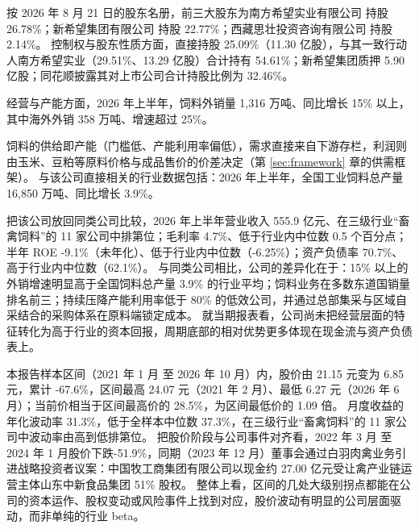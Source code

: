  按 2026 年 8 月 21 日的股东名册，前三大股东为南方希望实业有限公司 持股 26.78\%；新希望集团有限公司 持股 22.77\%；西藏思壮投资咨询有限公司 持股 2.14\%。 控制权与股东性质方面，直接持股 25.09\%（11.30 亿股），与其一致行动人南方希望实业（29.51\%、13.29 亿股）合计持有 54.61\%；新希望集团质押 5.90 亿股；同花顺披露其对上市公司合计持股比例为 32.46\%。

 经营与产能方面，2026 年上半年，饲料外销量 1,316 万吨、同比增长 15\% 以上，其中海外外销 358 万吨、增速超过 25\%。

 饲料的供给即产能（门槛低、产能利用率偏低），需求直接来自下游存栏，利润则由玉米、豆粕等原料价格与成品售价的价差决定（第 \ref{sec:framework} 章的供需框架）。 与该公司直接相关的行业数据包括：2026 年上半年，全国工业饲料总产量 16,850 万吨、同比增长 3.9\%。

 把该公司放回同类公司比较，2026 年上半年营业收入 555.9 亿元、在三级行业“畜禽饲料”的 11 家公司中排第位；毛利率 4.7\%、低于行业内中位数 0.5 个百分点；半年 ROE -9.1\%（未年化）、低于行业内中位数（-6.25\%）；资产负债率 70.7\%、高于行业内中位数（62.1\%）。 与同类公司相比，公司的差异化在于：15\% 以上的外销增速明显高于全国饲料总产量 3.9\% 的行业平均；饲料业务在多数东道国销量排名前三；持续压降产能利用率低于 80\% 的低效公司，并通过总部集采与区域自采结合的采购体系在原料端锁定成本。 就当期报表看，公司尚未把经营层面的特征转化为高于行业的资本回报，周期底部的相对优势更多体现在现金流与资产负债表上。

 本报告样本区间（2021 年 1 月 至 2026 年 10 月）内，股价由 21.15 元变为 6.85 元，累计 -67.6\%，区间最高 24.07 元（2021 年 2 月）、最低 6.27 元（2026 年 6 月）；当前价相当于区间最高价的 28.5\%，为区间最低价的 1.09 倍。 月度收益的年化波动率 31.3\%，低于全样本中位数 37.3\%，在三级行业“畜禽饲料”的 11 家公司中波动率由高到低排第位。 把股价阶段与公司事件对齐看，2022 年 3 月 至 2024 年 1 月股价下跌-51.9\%，同期（2023 年 12 月）董事会通过白羽肉禽业务引进战略投资者议案：中国牧工商集团有限公司以现金约 27.00 亿元受让禽产业链运营主体山东中新食品集团 51\% 股权。 整体上看，区间的几处大级别拐点都能在公司的资本运作、股权变动或风险事件上找到对应，股价波动有明显的公司层面驱动，而非单纯的行业 beta。

